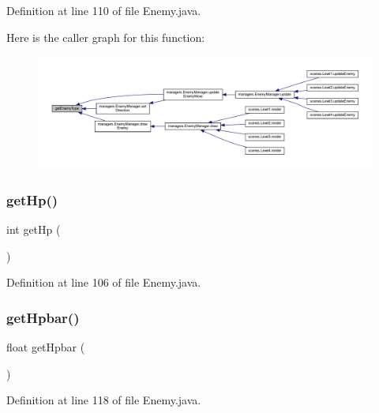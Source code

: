Definition at line 110 of file Enemy.\+java.

Here is the caller graph for this function\+:\nopagebreak
\begin{figure}[H]
\begin{center}
\leavevmode
\includegraphics[width=350pt]{classenemies_1_1_enemy_a40aced6dca930a3ae575a42b3286e230_icgraph}
\end{center}
\end{figure}
\mbox{\label{classenemies_1_1_enemy_a36ea7ddac664afde3e9f5e5f841855ee}} 
\subsubsection{\texorpdfstring{get\+Hp()}{getHp()}}
{\footnotesize\ttfamily int get\+Hp (\begin{DoxyParamCaption}{ }\end{DoxyParamCaption})}



Definition at line 106 of file Enemy.\+java.

\mbox{\label{classenemies_1_1_enemy_a719baea5da89286e1c263e1beb3ee35d}} 
\subsubsection{\texorpdfstring{get\+Hpbar()}{getHpbar()}}
{\footnotesize\ttfamily float get\+Hpbar (\begin{DoxyParamCaption}{ }\end{DoxyParamCaption})}



Definition at line 118 of file Enemy.\+java.

